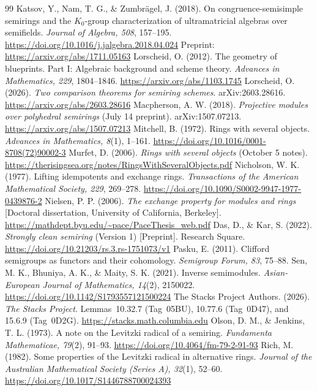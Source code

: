\documentclass[11pt]{amsart}
\theoremstyle{definition}
\theoremstyle{remark}
\begin{document}
\begin{thebibliography}{99}
 Katsov, Y., Nam, T. G., \& Zumbr\"agel, J. (2018). On congruence-semisimple semirings and the $K_0$-group characterization of ultramatricial algebras over semifields. \emph{Journal of Algebra, 508}, 157--195. \url{https://doi.org/10.1016/j.jalgebra.2018.04.024} Preprint: \url{https://arxiv.org/abs/1711.05163}
 Lorscheid, O. (2012). The geometry of blueprints. Part I: Algebraic background and scheme theory. \emph{Advances in Mathematics, 229}, 1804--1846. \url{https://arxiv.org/abs/1103.1745}
 Lorscheid, O. (2026). \emph{Two comparison theorems for semiring schemes}. arXiv:2603.28616. \url{https://arxiv.org/abs/2603.28616}
 Macpherson, A. W. (2018). \emph{Projective modules over polyhedral semirings} (July 14 preprint). arXiv:1507.07213. \url{https://arxiv.org/abs/1507.07213}
 Mitchell, B. (1972). Rings with several objects. \emph{Advances in Mathematics, 8}(1), 1--161. \url{https://doi.org/10.1016/0001-8708(72)90002-3}
 Murfet, D. (2006). \emph{Rings with several objects} (October 5 notes). \url{https://therisingsea.org/notes/RingsWithSeveralObjects.pdf}
 Nicholson, W. K. (1977). Lifting idempotents and exchange rings. \emph{Transactions of the American Mathematical Society, 229}, 269--278. \url{https://doi.org/10.1090/S0002-9947-1977-0439876-2}
 Nielsen, P. P. (2006). \emph{The exchange property for modules and rings} [Doctoral dissertation, University of California, Berkeley]. \url{https://mathdept.byu.edu/~pace/PaceThesis_web.pdf}
 Das, D., \& Kar, S. (2022). \emph{Strongly clean semiring} (Version 1) [Preprint]. Research Square. \url{https://doi.org/10.21203/rs.3.rs-1751073/v1}
 Pasku, E. (2011). Clifford semigroups as functors and their cohomology. \emph{Semigroup Forum, 83}, 75--88.
 Sen, M. K., Bhuniya, A. K., \& Maity, S. K. (2021). Inverse semimodules. \emph{Asian-European Journal of Mathematics, 14}(2), 2150022. \url{https://doi.org/10.1142/S1793557121500224}
 The Stacks Project Authors. (2026). \emph{The Stacks Project}. Lemmas~10.32.7 (Tag~05BU), 10.77.6 (Tag~0D47), and 15.6.9 (Tag~0D2G). \url{https://stacks.math.columbia.edu}
 Olson, D. M., \& Jenkins, T. L. (1973). A note on the Levitzki radical of a semiring. \emph{Fundamenta Mathematicae, 79}(2), 91--93. \url{https://doi.org/10.4064/fm-79-2-91-93}
 Rich, M. (1982). Some properties of the Levitzki radical in alternative rings. \emph{Journal of the Australian Mathematical Society (Series A), 32}(1), 52--60. \url{https://doi.org/10.1017/S1446788700024393}

\end{thebibliography}
\end{document}
